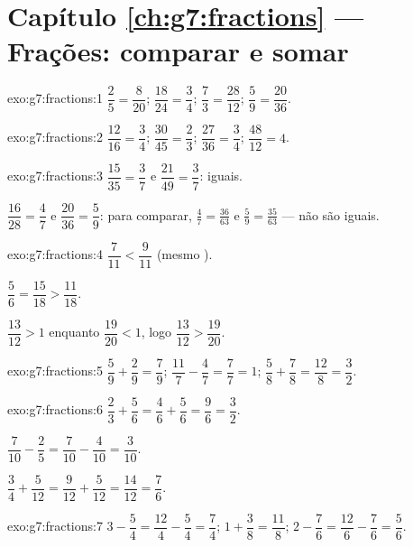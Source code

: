 \section*{Capítulo \ref{ch:g7:fractions} --- Frações: comparar e somar}

\begin{solution}{exo:g7:fractions:1}
$\dfrac{2}{5} = \dfrac{8}{20}$; \quad
$\dfrac{18}{24} = \dfrac{3}{4}$; \quad
$\dfrac{7}{3} = \dfrac{28}{12}$; \quad
$\dfrac{5}{9} = \dfrac{20}{36}$.
\end{solution}

\begin{solution}{exo:g7:fractions:2}
$\dfrac{12}{16} = \dfrac34$; \quad
$\dfrac{30}{45} = \dfrac23$; \quad
$\dfrac{27}{36} = \dfrac34$; \quad
$\dfrac{48}{12} = 4$.
\end{solution}

\begin{solution}{exo:g7:fractions:3}
$\dfrac{15}{35} = \dfrac37$ e $\dfrac{21}{49} = \dfrac37$: iguais.

$\dfrac{16}{28} = \dfrac47$ e $\dfrac{20}{36} = \dfrac59$: para
comparar, $\frac47 = \frac{36}{63}$ e $\frac59 = \frac{35}{63}$ --- não
são iguais.
\end{solution}

\begin{solution}{exo:g7:fractions:4}
$\dfrac{7}{11} < \dfrac{9}{11}$ (mesmo ).

$\dfrac56 = \dfrac{15}{18} > \dfrac{11}{18}$.

$\dfrac{13}{12} > 1$ enquanto $\dfrac{19}{20} < 1$, logo
$\dfrac{13}{12} > \dfrac{19}{20}$.
\end{solution}

\begin{solution}{exo:g7:fractions:5}
$\dfrac59 + \dfrac29 = \dfrac79$; \quad
$\dfrac{11}{7} - \dfrac47 = \dfrac77 = 1$; \quad
$\dfrac58 + \dfrac78 = \dfrac{12}{8} = \dfrac32$.
\end{solution}

\begin{solution}{exo:g7:fractions:6}
$\dfrac23 + \dfrac56 = \dfrac46 + \dfrac56 = \dfrac96 = \dfrac32$.

$\dfrac{7}{10} - \dfrac25 = \dfrac{7}{10} - \dfrac{4}{10} =
\dfrac{3}{10}$.

$\dfrac34 + \dfrac{5}{12} = \dfrac{9}{12} + \dfrac{5}{12} =
\dfrac{14}{12} = \dfrac76$.
\end{solution}

\begin{solution}{exo:g7:fractions:7}
$3 - \dfrac54 = \dfrac{12}{4} - \dfrac54 = \dfrac74$; \quad
$1 + \dfrac38 = \dfrac{11}{8}$; \quad
$2 - \dfrac76 = \dfrac{12}{6} - \dfrac76 = \dfrac56$.
\end{solution}

